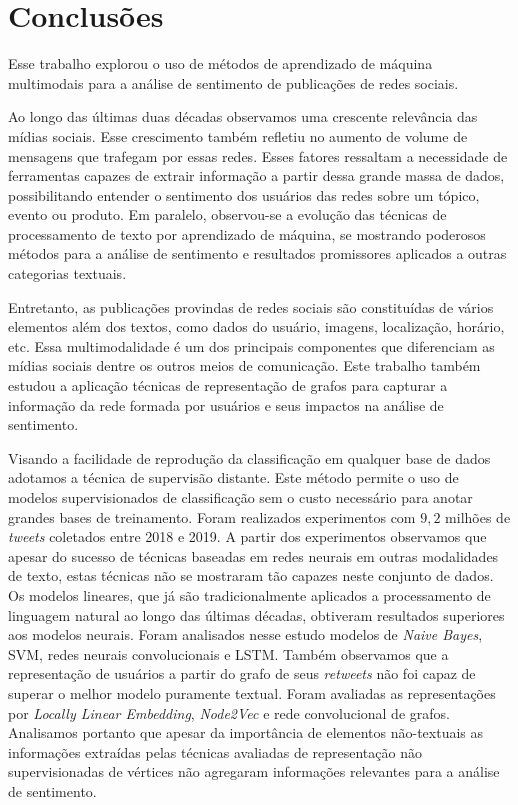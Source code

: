 \chapter{Conclusões}
\label{chapter:conclusion}

Esse trabalho explorou o uso de métodos de aprendizado de máquina multimodais
para a análise de sentimento de publicações de redes sociais.

Ao longo das últimas duas décadas observamos uma crescente relevância das mídias
sociais.
Esse crescimento também refletiu no aumento de volume de mensagens que
trafegam por essas redes.
Esses fatores ressaltam a necessidade de ferramentas capazes de extrair
informação a partir dessa grande massa de dados, possibilitando entender o
sentimento dos usuários das redes sobre um tópico, evento ou produto.
Em paralelo, observou-se a evolução das técnicas de processamento de texto por
aprendizado de máquina, se mostrando poderosos métodos para a análise de
sentimento e resultados promissores aplicados a outras categorias textuais.

Entretanto, as publicações provindas de redes sociais são constituídas de vários
elementos além dos textos, como dados do usuário, imagens, localização, horário,
etc.
Essa multimodalidade é um dos principais componentes que diferenciam as mídias
sociais dentre os outros meios de comunicação.
Este trabalho também estudou a aplicação técnicas de representação de grafos para
capturar a informação da rede formada por usuários e seus impactos na análise de
sentimento.

Visando a facilidade de reprodução da classificação em qualquer base de dados
adotamos a técnica de supervisão distante.
Este método permite o uso de modelos supervisionados de classificação sem o
custo necessário para anotar grandes bases de treinamento.
Foram realizados experimentos com $9,2$ milhões de \textit{tweets} coletados
entre 2018 e 2019.
A partir dos experimentos observamos que apesar do sucesso de técnicas baseadas
em redes neurais em outras modalidades de texto, estas técnicas não se mostraram
tão capazes neste conjunto de dados.
Os modelos lineares, que já são tradicionalmente aplicados a processamento de
linguagem natural ao longo das últimas décadas, obtiveram resultados superiores aos
modelos neurais.
Foram analisados nesse estudo modelos de \textit{Naive Bayes}, SVM, redes
neurais convolucionais e LSTM.
Também observamos que a representação de usuários a partir do grafo de seus
\textit{retweets} não foi capaz de superar o melhor modelo puramente textual.
Foram avaliadas as representações por \textit{Locally Linear Embedding},
\textit{Node2Vec} e rede convolucional de grafos.
Analisamos portanto que apesar da importância de elementos não-textuais as
informações extraídas pelas técnicas avaliadas de representação não
supervisionadas de vértices não agregaram informações relevantes para a análise
de sentimento.


